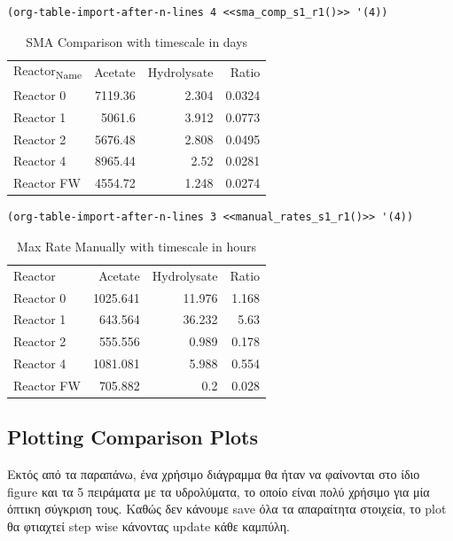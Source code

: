 \documentclass[11pt]{article}
\begin{document}
\begin{verbatim}
(org-table-import-after-n-lines 4 <<sma_comp_s1_r1()>> '(4))
\end{verbatim}

\begin{table}[htbp]
\caption{SMA Comparison with timescale in days}
\centering
\begin{tabular}{lrrr}
Reactor\textsubscript{Name} & Acetate & Hydrolysate & Ratio\\[0pt]
Reactor 0 & 7119.36 & 2.304 & 0.0324\\[0pt]
Reactor 1 & 5061.6 & 3.912 & 0.0773\\[0pt]
Reactor 2 & 5676.48 & 2.808 & 0.0495\\[0pt]
Reactor 4 & 8965.44 & 2.52 & 0.0281\\[0pt]
Reactor FW & 4554.72 & 1.248 & 0.0274\\[0pt]
\end{tabular}
\end{table}

\begin{verbatim}
(org-table-import-after-n-lines 3 <<manual_rates_s1_r1()>> '(4))
\end{verbatim}

\begin{table}[htbp]
\caption{Max Rate Manually with timescale in hours}
\centering
\begin{tabular}{lrrr}
Reactor & Acetate & Hydrolysate & Ratio\\[0pt]
Reactor 0 & 1025.641 & 11.976 & 1.168\\[0pt]
Reactor 1 & 643.564 & 36.232 & 5.63\\[0pt]
Reactor 2 & 555.556 & 0.989 & 0.178\\[0pt]
Reactor 4 & 1081.081 & 5.988 & 0.554\\[0pt]
Reactor FW & 705.882 & 0.2 & 0.028\\[0pt]
\end{tabular}
\end{table}

\subsection{Plotting Comparison Plots}
\label{sec:org60f93b8}
Εκτός από τα παραπάνω, ένα χρήσιμο διάγραμμα θα ήταν να φαίνονται στο ίδιο figure και τα 5 πειράματα με τα υδρολύματα, το οποίο είναι πολύ χρήσιμο για μία όπτικη σύγκριση τους. Καθώς δεν κάνουμε save όλα τα απαραίτητα στοιχεία, το plot θα φτιαχτεί step wise κάνοντας update κάθε καμπύλη.
\end{document}
